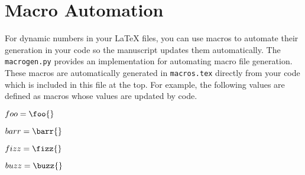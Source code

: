 \documentclass[12pt,twocolumn]{article}
\begin{document}
\section{Macro Automation}

For dynamic numbers in your \LaTeX{} files, you can use macros to automate their generation in your code so the manuscript updates them automatically.
%
The \texttt{macrogen.py} provides an implementation for automating macro file generation.
%
These macros are automatically generated in \texttt{macros.tex} directly from your code which is included in this file at the top.
%
For example, the following values are defined as macros whose values are updated by code.


$foo = \foo{}$

$barr = \barr{}$

$fizz = \fizz{}$

$buzz = \buzz{}$
\end{document}
